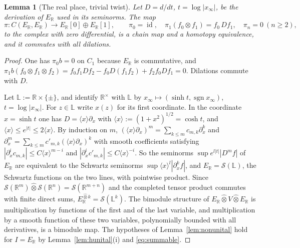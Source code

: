 \documentclass[11pt]{amsart}
\newtheorem{lemma}[theorem]{Lemma}
\theoremstyle{definition}
\theoremstyle{remark}
\newcommand{\R}{\mathbb R}
\newcommand{\sgn}{\operatorname{sgn}}
\newcommand{\id}{\operatorname{id}}
\begin{document}
\begin{lemma}[The real place, trivial twist]\label{lem:realuntw}
Let $D=d/dt$, $t=\log|x_{\infty}|$, be the derivation of $E_{\R}$ used in its
seminorms.  The map
\[
\pi:C(E_{\R},E_{\R})\to E_{\R}[0]\oplus E_{\R}[1],\qquad
\pi_0=\id,\quad \pi_1(f_0\otimes f_1)=f_0\,Df_1,\quad \pi_n=0\ (n\ge2),
\]
to the complex with zero differential, is a chain map and a homotopy
equivalence, and it commutes with all dilations.
\end{lemma}

\begin{proof}
One has $\pi_0b=0$ on $C_1$ because $E_{\R}$ is commutative, and
$\pi_1b(f_0\otimes f_1\otimes f_2)=f_0f_1Df_2-f_0D(f_1f_2)+f_2f_0Df_1=0$.
Dilations commute with $D$.

Let $\mathbb L:=\R\times\{\pm\}$, and identify $\R^{\times}$ with $\mathbb L$
by $x_{\infty}\mapsto(\sinh t,\sgn x_{\infty})$, $t=\log|x_{\infty}|$.  For
$z\in\mathbb L$ write $x(z)$ for its first coordinate.  In the coordinate
$x=\sinh t$ one has $D=\langle x\rangle\partial_x$ with
$\langle x\rangle:=(1+x^{2})^{1/2}=\cosh t$, and
$\langle x\rangle\le e^{|t|}\le2\langle x\rangle$.  By induction on $m$,
$(\langle x\rangle\partial_x)^{m}=\sum_{k\le m}c_{m,k}\partial_x^{k}$ and
$\partial_x^{m}=\sum_{k\le m}c'_{m,k}(\langle x\rangle\partial_x)^{k}$ with smooth
coefficients satisfying $|\partial_x^{i}c_{m,k}|\le C\langle x\rangle^{m-i}$ and
$|\partial_x^{i}c'_{m,k}|\le C\langle x\rangle^{-i}$.  So the seminorms
$\sup e^{l|t|}|D^{m}f|$ of $E_{\R}$ are equivalent to the Schwartz seminorms
$\sup\langle x\rangle^{l}|\partial_x^{k}f|$, and $E_{\R}=\mathcal S(\mathbb L)$,
the Schwartz functions on the two lines, with pointwise product.  Since
$\mathcal S(\R^{m})\widehat\otimes\mathcal S(\R^{n})=\mathcal S(\R^{m+n})$
\cite[Theorem~51.6]{Treves} and the completed tensor product commutes with
finite direct sums, $E_{\R}^{\widehat\otimes k}=\mathcal S(\mathbb L^{k})$.  The
bimodule structure of $E_{\R}\widehat\otimes V\widehat\otimes E_{\R}$ is
multiplication by functions of the first and of the last variable, and
multiplication by a smooth function of these two variables, polynomially
bounded with all derivatives, is a bimodule map.  The hypotheses of
Lemma~\ref{lem:nonunital} hold for $I=E_{\R}$ by Lemma~\ref{lem:hunital}(i)
and \eqref{eq:summable}.


\end{proof}
\end{document}
